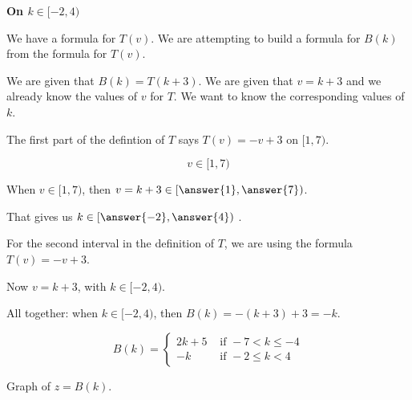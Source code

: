 \documentclass{ximera}
\begin{document}
\begin{explanation} \textbf{\textcolor{red!75!green}{On $k \in [-2,4)$}} 


We have a formula for $T(v)$.  We are attempting to build a formula for $B(k)$ from the formula for $T(v)$.

We are given that $B(k) = T(k+3)$.  We are given that $v = k+3$ and we already know the values of $v$ for $T$.  We want to know the corresponding values of $k$.

The first part of the defintion of $T$ says $T(v) = -v + 3$ on $[1,7)$.

\[
v \in [1,7)
\]

When $v \in [1,7)$, then $v = k+3 \in \left[\answer{1},\answer{7}\right)$.  

That gives us $k \in \left[\answer{-2},\answer{4}\right)$ .


For the second interval in the definition of $T$, we are using the formula $T(v) = -v + 3$. 

Now $v = k + 3$, with $k \in [-2, 4)$.

All together: when $k \in [-2, 4)$, then $B(k) = -(k+3)+3 = -k$. 


\end{explanation}












\[
B(k) = 
\begin{cases}
  2k+5 & \text{ if }  -7 < k \leq -4 \\
  -k & \text{ if } -2 \leq k < 4
\end{cases}
\]





Graph of $z = B(k)$.
\end{document}
